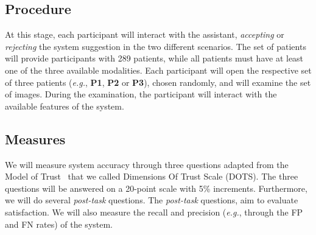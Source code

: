 \subsection{Procedure}
\label{sec:sec00404}

At this stage, each participant will interact with the assistant, {\it accepting} or {\it rejecting} the system suggestion in the two different scenarios.
The set of patients will provide participants with 289 patients, while all patients must have at least one of the three available modalities.
Each participant will open the respective set of three patients ({\it e.g.}, {\bf P1}, {\bf P2} or {\bf P3}), chosen randomly, and will examine the set of images.
During the examination, the participant will interact with the available features of the system.

\subsection{Measures}
\label{sec:sec00405}

We will measure system accuracy through three questions adapted from the Model of Trust~\cite{schoorman2016perspective} that we called Dimensions Of Trust Scale (DOTS).
The three questions will be answered on a 20-point scale with 5\% increments.
Furthermore, we will do several {\it post-task} questions.
The {\it post-task} questions, aim to evaluate satisfaction.
We will also measure the recall and precision ({\it e.g.}, through the FP and FN rates) of the system.

\break